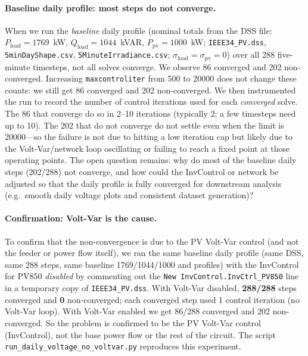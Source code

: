 \documentclass[11pt]{article}
\begin{document}
\paragraph{Baseline daily profile: most steps do not converge.}
When we run the \emph{baseline} daily profile (nominal totals from the DSS file: $P_{\mathrm{load}}=1769$~kW, $Q_{\mathrm{load}}=1044$~kVAR, $P_{\mathrm{pv}}=1000$~kW; \texttt{IEEE34\_PV.dss}, \texttt{5minDayShape.csv}, \texttt{5MinuteIrradiance.csv}; $\sigma_{\mathrm{load}}=\sigma_{\mathrm{pv}}=0$) over all 288 five-minute timesteps, not all solves converge. We observe 86 converged and 202 non-converged. Increasing \texttt{maxcontroliter} from 500 to 20000 does not change these counts: we still get 86 converged and 202 non-converged. We then instrumented the run to record the number of control iterations used for each \emph{converged} solve. The 86 that converge do so in 2--10 iterations (typically 2; a few timesteps need up to 10). The 202 that do not converge do not settle even when the limit is 20000---so the failure is not due to hitting a low iteration cap but likely due to the Volt-Var/network loop oscillating or failing to reach a fixed point at those operating points. The open question remains: why do most of the baseline daily steps (202/288) not converge, and how could the InvControl or network be adjusted so that the daily profile is fully converged for downstream analysis (e.g.\ smooth daily voltage plots and consistent dataset generation)?

\paragraph{Confirmation: Volt-Var is the cause.}
To confirm that the non-convergence is due to the PV Volt-Var control (and not the feeder or power flow itself), we ran the same baseline daily profile (same DSS, same 288 steps, same baseline 1769/1044/1000 and profiles) with the InvControl for PV850 \emph{disabled} by commenting out the \texttt{New InvControl.InvCtrl\_PV850} line in a temporary copy of \texttt{IEEE34\_PV.dss}. With Volt-Var disabled, \textbf{288/288} steps converged and \textbf{0} non-converged; each converged step used 1 control iteration (no Volt-Var loop). With Volt-Var enabled we get 86/288 converged and 202 non-converged. So the problem is confirmed to be the PV Volt-Var control (InvControl), not the base power flow or the rest of the circuit. The script \texttt{run\_daily\_voltage\_no\_voltvar.py} reproduces this experiment.
\end{document}
